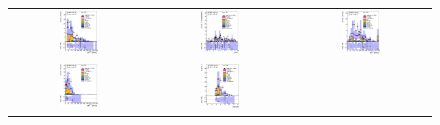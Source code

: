 \begin{figure}[h!]
\begin{center}
\begin{tabular}{ccc}
%
\includegraphics[width=0.30\textwidth]{appendices/figures/sdrs/LepPt_ELEMUONCR8_1W_NOMINAL.eps} &
\includegraphics[width=0.30\textwidth]{appendices/figures/sdrs/LepEta_ELEMUONCR8_1W_NOMINAL.eps} &
\includegraphics[width=0.30\textwidth]{appendices/figures/sdrs/MET_ELEMUONCR8_1W_NOMINAL.eps} \\
\includegraphics[width=0.30\textwidth]{appendices/figures/sdrs/Wlep_MassT_ELEMUONCR8_1W_NOMINAL.eps} &
\includegraphics[width=0.30\textwidth]{appendices/figures/sdrs/Njets25_ELEMUONCR8_1W_NOMINAL.eps}  &

\end{tabular}
\end{center}
\end{figure}
